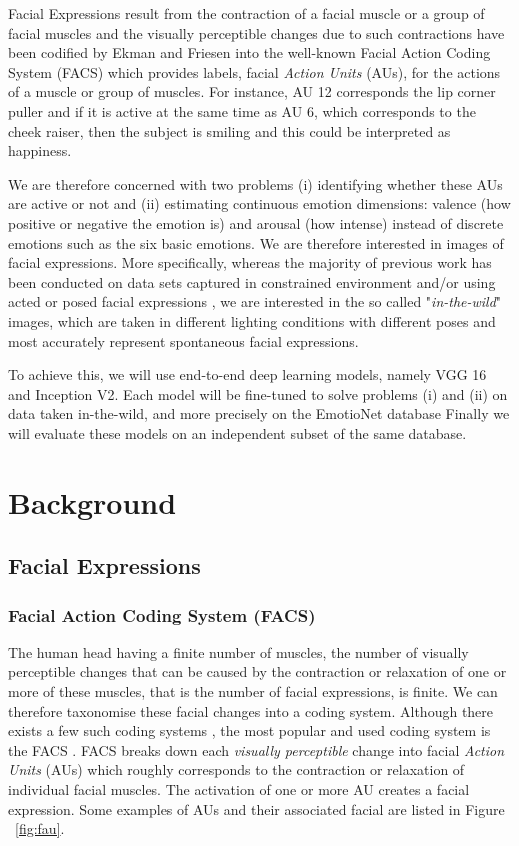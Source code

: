 \documentclass[12pt,twoside]{article}
\begin{document}
Facial Expressions result from the contraction of a facial muscle or a group of facial muscles and the visually perceptible changes due to such contractions have been codified by Ekman and Friesen into the well-known Facial Action Coding System (FACS) \cite{RefWorks:10} which provides labels, facial \textit{Action Units} (AUs), for the actions of a muscle or group of muscles. For instance, AU 12 corresponds the lip corner puller and if it is active at the same time as AU 6, which corresponds to the cheek raiser, then the subject is smiling and this could be interpreted as happiness.

We are therefore concerned with two problems (i) identifying whether these AUs
are active or not and (ii) estimating continuous emotion dimensions: valence 
(how positive or negative the emotion is) and arousal (how intense) instead of 
discrete emotions such as the six basic emotions. We are therefore interested
in images of facial expressions. More specifically, whereas the majority of previous 
work has been conducted on data sets captured in constrained environment and/or using 
acted or posed facial expressions \cite{RefWorks:2}, we are interested in the so 
called "\textit{in-the-wild}" images, which are taken in different lighting conditions 
with different poses and most accurately represent spontaneous facial expressions.

To achieve this, we will use end-to-end deep learning models, namely VGG 16 and
Inception V2. Each model will be fine-tuned to solve problems (i) and (ii) on
data taken in-the-wild, and more precisely on the EmotioNet \cite{RefWorks:1} database 
Finally we will evaluate these models on an independent subset of the same
database.

\clearpage
\section{Background}

\subsection{Facial Expressions}

\subsubsection{Facial Action Coding System (FACS)}

The human head having a finite number of muscles, the number of visually
perceptible changes that can be caused by the contraction or relaxation of one
or more of these muscles, that is the number of facial expressions, is finite.
We can therefore taxonomise these facial changes into a coding system. Although
there exists a few such coding systems \cite{RefWorks:13}, the most popular and
used coding system is the FACS \cite{RefWorks:10}. FACS breaks down each
\textit{visually perceptible} change into facial \textit{Action Units} (AUs) which roughly corresponds to the contraction or relaxation of individual facial muscles. The activation of one or more AU creates a facial expression. Some examples of AUs and their associated facial are listed in Figure ~\ref{fig:fau}.
\end{document}
